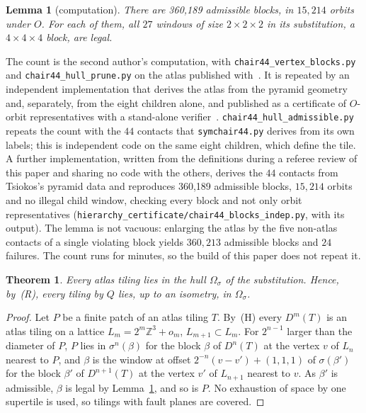 \documentclass[11pt]{article}
\newtheorem{thm}{Theorem}
\newtheorem{lem}{Lemma}
\theoremstyle{definition}
\theoremstyle{remark}
\newcommand{\code}[1]{\texttt{#1}}
\begin{document}
\begin{lem}[computation]
\label{lem:blocks}
There are 360{,}189 admissible blocks, in $15{,}214$ orbits under $O$.  For each of them, all $27$ windows of size $2\times2\times2$
in its substitution, a $4\times4\times4$ block, are legal.
\end{lem}

\noindent
The count is the second author's computation, with \code{chair44\_vertex\_blocks.py} and \code{chair44\_hull\_prune.py} on the atlas
published with~\cite{Tsiokos1}.  It is repeated by an independent implementation that derives the atlas from the pyramid
geometry and, separately, from the eight children alone, and published as a certificate of $O$-orbit representatives with a
stand-alone verifier~\cite{Romanov}.  \code{chair44\_hull\_admissible.py} repeats the count with the $44$ contacts that
\code{symchair44.py} derives from its own labels; this is independent code on the same eight children, which define the
tile.  A further implementation, written from the definitions during a referee review of this paper and sharing no code with the
others, derives the $44$ contacts from Tsiokos's pyramid data and reproduces 360{,}189 admissible blocks, $15{,}214$ orbits and
no illegal child window, checking every block and not only orbit representatives
(\code{hierarchy\_certificate/chair44\_blocks\_indep.py}, with its output).
The lemma is not vacuous: enlarging the atlas by the five non-atlas contacts of a single violating block yields
$360{,}213$ admissible blocks and $24$ failures.  The count runs for minutes, so the build of this paper does not repeat it.

\begin{thm}
\label{thm:hull}
Every atlas tiling lies in the hull $\Omega_{\sigma}$ of the substitution.  Hence, by~(R), every tiling by $Q$
lies, up to an isometry, in $\Omega_{\sigma}$.
\end{thm}

\begin{proof}
Let $P$ be a finite patch of an atlas tiling $T$.  By~(H) every $D^{m}(T)$ is an atlas tiling on a lattice
$L_{m}=2^{m}\mathbb{Z}^{3}+o_{m}$, $L_{m+1}\subset L_{m}$.  For $2^{n-1}$ larger than the diameter of $P$, $P$ lies in
$\sigma^{n}(\beta)$ for the block $\beta$ of $D^{n}(T)$ at the vertex $v$ of $L_{n}$ nearest to $P$, and $\beta$ is the window at
offset $2^{-n}(v-v')+(1,1,1)$ of $\sigma(\beta')$ for the block $\beta'$ of $D^{n+1}(T)$ at the vertex $v'$ of $L_{n+1}$ nearest to
$v$.  As $\beta'$ is admissible, $\beta$ is legal by Lemma~\ref{lem:blocks}, and so is $P$.  No exhaustion of space by one
supertile is used, so tilings with fault planes are covered.
\end{proof}
\end{document}
